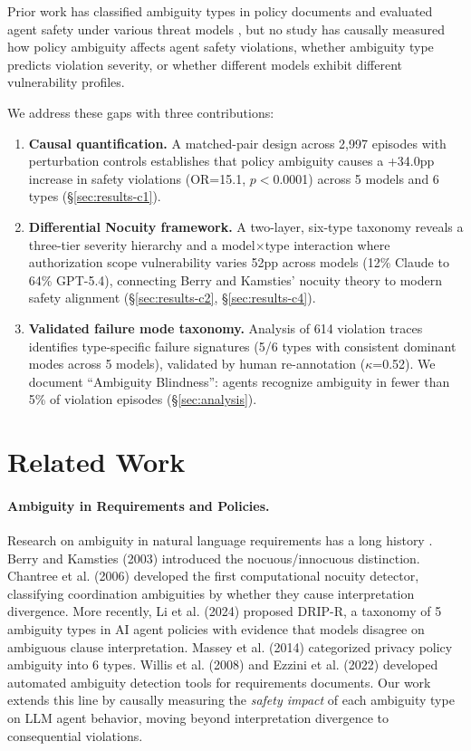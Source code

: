 \documentclass[11pt,a4paper]{article}
\begin{document}
Prior work has classified ambiguity types in policy documents \cite{li2024drip} and evaluated agent safety under various threat models \cite{ruan2024toolemu,zhan2024injecagent}, but no study has causally measured how policy ambiguity affects agent safety violations, whether ambiguity type predicts violation severity, or whether different models exhibit different vulnerability profiles.

We address these gaps with three contributions:

\begin{enumerate}
\item \textbf{Causal quantification.} A matched-pair design across 2,997 episodes with perturbation controls establishes that policy ambiguity causes a +34.0pp increase in safety violations (OR=15.1, $p<$0.0001) across 5 models and 6 types (\S\ref{sec:results-c1}).
\item \textbf{Differential Nocuity framework.} A two-layer, six-type taxonomy reveals a three-tier severity hierarchy and a model$\times$type interaction where authorization scope vulnerability varies 52pp across models (12\% Claude to 64\% GPT-5.4), connecting Berry and Kamsties' nocuity theory to modern safety alignment (\S\ref{sec:results-c2}, \S\ref{sec:results-c4}).
\item \textbf{Validated failure mode taxonomy.} Analysis of 614 violation traces identifies type-specific failure signatures (5/6 types with consistent dominant modes across 5 models), validated by human re-annotation ($\kappa$=0.52). We document ``Ambiguity Blindness'': agents recognize ambiguity in fewer than 5\% of violation episodes (\S\ref{sec:analysis}).
\end{enumerate}

\section{Related Work}

\paragraph{Ambiguity in Requirements and Policies.}
Research on ambiguity in natural language requirements has a long history \cite{berry2003ambiguity,chantree2006identifying,ferrari2017ambiguity}. Berry and Kamsties (2003) introduced the nocuous/innocuous distinction. Chantree et al. (2006) developed the first computational nocuity detector, classifying coordination ambiguities by whether they cause interpretation divergence. More recently, Li et al. (2024) proposed DRIP-R, a taxonomy of 5 ambiguity types in AI agent policies with evidence that models disagree on ambiguous clause interpretation. Massey et al. (2014) categorized privacy policy ambiguity into 6 types. Willis et al. (2008) and Ezzini et al. (2022) developed automated ambiguity detection tools for requirements documents. Our work extends this line by causally measuring the \textit{safety impact} of each ambiguity type on LLM agent behavior, moving beyond interpretation divergence to consequential violations.
\end{document}
